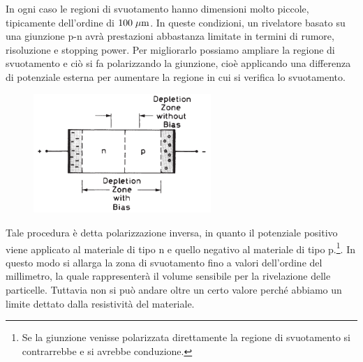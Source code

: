 In ogni caso le regioni di svuotamento hanno dimensioni molto piccole, tipicamente dell'ordine di $100 \; \rm \mu m$. In queste condizioni, un rivelatore basato su una giunzione p-n avrà prestazioni abbastanza limitate in termini di rumore, risoluzione e stopping power. Per migliorarlo possiamo ampliare la regione di svuotamento e ciò si fa polarizzando la giunzione, cioè applicando una differenza di potenziale esterna per aumentare la regione in cui si verifica lo svuotamento.
\begin{figure}[H]
   \centering
   \includegraphics[width=0.6\textwidth]{immagini/regione_svuotamento_ampliata.png}
\end{figure}
Tale procedura è detta polarizzazione inversa, in quanto il potenziale positivo viene applicato al materiale di tipo n e quello negativo al materiale di tipo p.\footnote{Se la giunzione venisse polarizzata direttamente la regione di svuotamento si contrarrebbe e si avrebbe conduzione.}. In questo modo si allarga la zona di svuotamento fino a valori dell'ordine del millimetro, la quale rappresenterà il volume sensibile per la rivelazione delle particelle. Tuttavia non si può andare oltre un certo valore perché abbiamo un limite dettato dalla resistività del materiale.

\vfill

